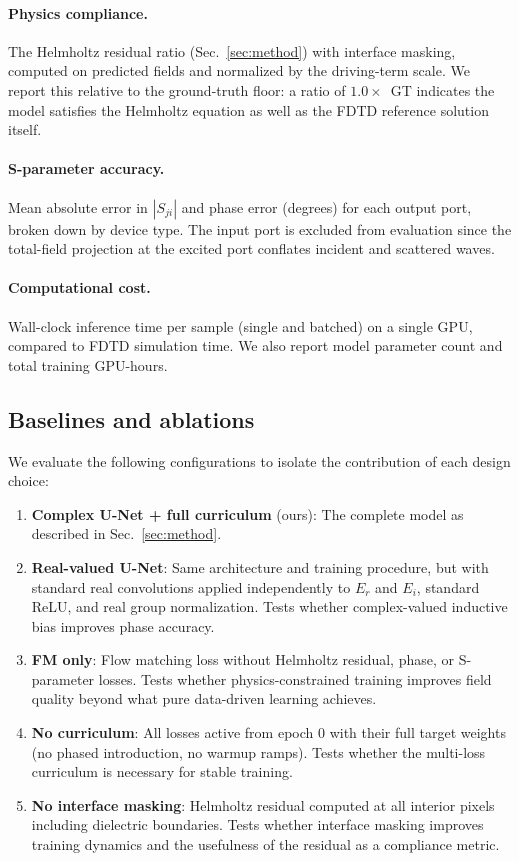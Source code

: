 \paragraph{Physics compliance.}
The Helmholtz residual ratio (Sec.~\ref{sec:method}) with interface masking, computed on predicted fields and
normalized by the driving-term scale. We report this relative to the ground-truth floor: a ratio of $1.0\times$~GT
indicates the model satisfies the Helmholtz equation as well as the FDTD reference solution itself.

\paragraph{S-parameter accuracy.}
Mean absolute error in $|S_{ji}|$ and phase error (degrees) for each output port, broken down by device type. The
input port is excluded from evaluation since the total-field projection at the excited port conflates incident and
scattered waves.

\paragraph{Computational cost.}
Wall-clock inference time per sample (single and batched) on a single GPU, compared to FDTD simulation time. We also
report model parameter count and total training GPU-hours.

\subsection{Baselines and ablations}

We evaluate the following configurations to isolate the contribution of each design choice:

\begin{enumerate}
    \item \textbf{Complex U-Net + full curriculum} (ours): The complete model as described in Sec.~\ref{sec:method}.
    \item \textbf{Real-valued U-Net}: Same architecture and training procedure, but with standard real convolutions
          applied independently to $E_r$ and $E_i$, standard ReLU, and real group normalization. Tests whether
          complex-valued inductive bias improves phase accuracy.
    \item \textbf{FM only}: Flow matching loss without Helmholtz residual, phase, or S-parameter losses. Tests
          whether physics-constrained training improves field quality beyond what pure data-driven learning achieves.
    \item \textbf{No curriculum}: All losses active from epoch 0 with their full target weights (no phased
          introduction, no warmup ramps). Tests whether the multi-loss curriculum is necessary for stable training.
    \item \textbf{No interface masking}: Helmholtz residual computed at all interior pixels including dielectric
          boundaries. Tests whether interface masking improves training dynamics and the usefulness of the residual
          as a compliance metric.
\end{enumerate}

